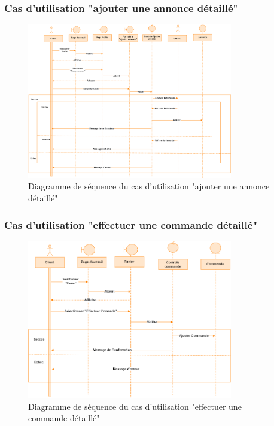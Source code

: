 \documentclass[edit,12pt,a4paper,ChapStyle,oneside,doubleinterligne]{report}
\begin{document}
\newpage
\subsubsection{Cas d'utilisation "ajouter une annonce détaillé"}
\begin{figure}[h!]\label{fig:Diagramme cas 3d}
\centering
\includegraphics[width=0.8\textwidth]{images/Ajouter une annonce d.png}
\caption{Diagramme de séquence du cas d'utilisation "ajouter une annonce détaillé"}
\end{figure}

\newpage
\subsubsection{Cas d'utilisation "effectuer une commande détaillé"}
\begin{figure}[h!]\label{fig:Diagramme cas 4d}
\centering
\includegraphics[width=0.8\textwidth]{images/Effectuer une commande d.png}
\caption{Diagramme de séquence du cas d'utilisation "effectuer une commande détaillé"}
\end{figure}
\end{document}
